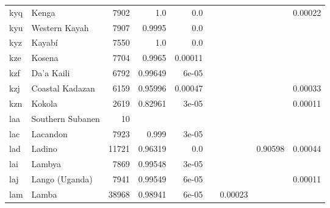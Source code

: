 \documentclass[11pt]{article}
\begin{document}
\begin{table*}[h]
{\begin{tabular}{llrrrrrrr}
kyq         & Kenga         & 7902         & 1.0         & 0.0         &          &          &          & 0.00022         \\

kyu         & Western Kayah         & 7907         & 0.9995         & 0.0         &          &          &          &          \\

kyz         & Kayabí         & 7550         & 1.0         & 0.0         &          &          &          &          \\

kze         & Kosena         & 7704         & 0.9965         & 0.00011         &          &          &          &          \\

kzf         & Da'a Kaili         & 6792         & 0.99649         & 6e-05         &          &          &          &          \\

kzj         & Coastal Kadazan         & 6159         & 0.95996         & 0.00047         &          &          &          & 0.00033         \\

kzn         & Kokola         & 2619         & 0.82961         & 3e-05         &          &          &          & 0.00011         \\

laa         & Southern Subanen         & 10         &          &          &          &          &          &          \\

lac         & Lacandon         & 7923         & 0.999         & 3e-05         &          &          &          &          \\

lad         & Ladino         & 11721         & 0.96319         & 0.0         &          &          & 0.90598         & 0.00044         \\

lai         & Lambya         & 7869         & 0.99548         & 3e-05         &          &          &          &          \\

laj         & Lango (Uganda)         & 7941         & 0.99549         & 6e-05         &          &          &          & 0.00011         \\

lam         & Lamba         & 38968         & 0.98941         & 6e-05         &          & 0.00023         &          &          \\


\end{tabular}}
\end{table*}
\end{document}
